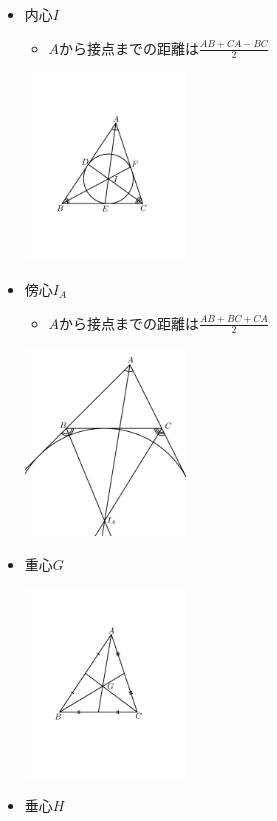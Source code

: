 \documentclass[uplatex,dvipdfmx]{jsbook}
\begin{document}
\begin{itemize}
    \item 内心$I$
    \begin{itemize}
        \item $A$から接点までの距離は$\displaystyle \frac{AB+CA-BC}{2}$
    \end{itemize}
    \includegraphics[clip,height=5cm]{figures/Naishin.pdf}

    \item 傍心$I_A$
    \begin{itemize}
        \item $A$から接点までの距離は$\displaystyle \frac{AB+BC+CA}{2}$
    \end{itemize}
    \includegraphics[clip,height=5cm]{figures/Boushin.pdf}

    \item 重心$G$

    \includegraphics[clip,height=5cm]{figures/Jushin.pdf}

    \item 垂心$H$


\end{itemize}
\end{document}
